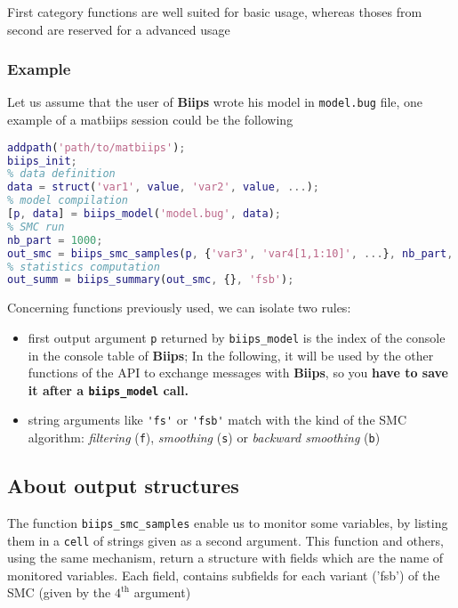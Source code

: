 \documentclass[11pt,twoside]{article}
\newcommand{\biips}{{\bf Biips}{}}
\begin{document}
   First category functions are well suited for basic usage, whereas thoses from second are reserved for a advanced usage
   
   \subsubsection{Example}

   Let us assume that the user of \biips{} wrote his model in \verb!model.bug! file, one example of a matbiips session
   could be the following 

\begin{lstlisting}[language=matlab]
% initial loading 
addpath('path/to/matbiips');
biips_init;
% data definition 
data = struct('var1', value, 'var2', value, ...);
% model compilation
[p, data] = biips_model('model.bug', data);
% SMC run
nb_part = 1000;
out_smc = biips_smc_samples(p, {'var3', 'var4[1,1:10]', ...}, nb_part, 'fsb')
% statistics computation
out_summ = biips_summary(out_smc, {}, 'fsb');
\end{lstlisting}

   Concerning functions previously used, we can isolate two rules:
     \begin{itemize}
       \item first output argument \texttt{p} returned by \texttt{biips\_model} is the index of the console in the console table 
       of \biips{}; In the following, it will be used by the other functions of the API to exchange messages with \biips{},
       so you {\bf have to save it after a \texttt{biips\_model} call.}
       \item string arguments like \verb!'fs'! or \verb!'fsb'! match with the kind of the SMC algorithm: 
        {\em filtering} (\verb!f!), {\em smoothing} (\verb!s!) or {\em backward smoothing} (\verb!b!) 
     \end{itemize}


  \subsection{About output structures}
  
  The function \verb!biips_smc_samples! enable us to monitor some variables, by listing
  them in a \verb!cell! of strings given as a second argument. This function and others, using the same mechanism, return a structure with fields
  which are the name of monitored variables. Each field, contains subfields for each variant ('fsb') of the SMC (given by the $4^{\mbox{th}}$
  argument) 
  \paragraph{}
  
\end{document}
